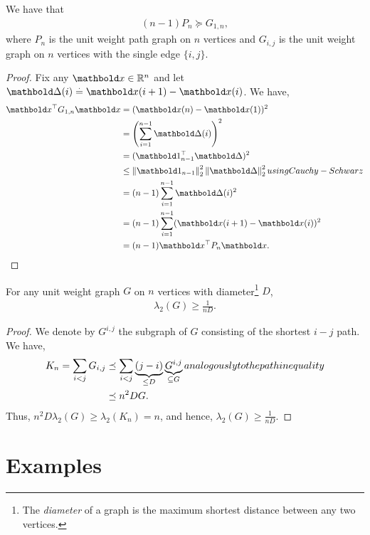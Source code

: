 \begin{lem} We have that \begin{align}
    (n-1) P_n \succeq G_{1,n},
\end{align} where $P_n$ is the unit weight path graph on $n$ vertices and $G_{i,j}$ is the unit weight graph on $n$ vertices with the single edge $\{i,j\}$.
\end{lem}
\begin{proof}
Fix any $\vx \in \R^n$ and let $\vDelta(i) \defeq \vx(i+1) - \vx(i)$. We have, \begin{align*}
    \trans{\vx}G_{1,n}\vx &= (\vx(n) - \vx(1))^2 \\
    &= \parentheses*{\sum_{i=1}^{n-1} \vDelta(i)}^2 \\
    &= (\trans{\vOne_{n-1}}\vDelta)^2 \\
    &\leq \norm{\vOne_{n-1}}_2^2 \norm{\vDelta}_2^2 \margintag{using Cauchy-Schwarz} \\
    &= (n-1) \sum_{i=1}^{n-1} \vDelta(i)^2 \\
    &= (n-1) \sum_{i=1}^{n-1} (\vx(i+1) - \vx(i))^2 \\
    &= (n-1)\trans{\vx}P_n\vx. \qedhere
\end{align*}
\end{proof}

\begin{lem}
For any unit weight graph $G$ on $n$ vertices with diameter\footnote{The \emph{diameter} of a graph is the maximum shortest distance between any two vertices.} $D$, \begin{align}
    \lambda_2(G) \geq \frac{1}{nD}.
\end{align}
\end{lem}
\begin{proof} We denote by $G^{i,j}$ the subgraph of $G$ consisting of the shortest $i-j$ path. We have, \begin{align*}
    K_n = \sum_{i < j} G_{i,j} &\preceq \sum_{i<j} \underbrace{(j-i)}_{\leq D} \underbrace{G^{i,j}}_{\subseteq G} \margintag{analogously to the path inequality} \\
    &\preceq n^2 D G.
\end{align*} Thus, $n^2 D \lambda_2(G) \geq \lambda_2(K_n) = n$, and hence, $\lambda_2(G) \geq \frac{1}{nD}$.
\end{proof}

\section{Examples}

